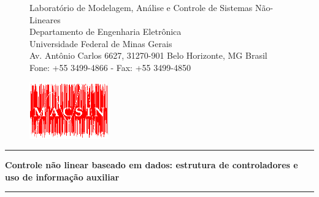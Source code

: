 
\begin{titlepage}

\begin{figure}[!ht]
\begin{minipage}[b]{0.7\linewidth}
\begin{tiny}
Laboratório de Modelagem, Análise e Controle de Sistemas Não-Lineares \\
Departamento de Engenharia Eletrônica\\
Universidade Federal de Minas Gerais\\
Av. Antônio Carlos 6627, 31270-901 Belo Horizonte, MG Brasil\\

Fone: +55 3499-4866 - Fax: +55 3499-4850 %
\end{tiny}
\end{minipage}\hfill
\begin{minipage}[c]{0.3\linewidth}
\begin{flushright}
\vspace{-1.2cm}
\includegraphics[scale=1.37]{mac.png}
\end{flushright}
\end{minipage}
\end{figure}

\vspace{1.75cm}
\begin{center}
\thickhrulefill
\par\nobreak
\vspace*{10pt}%
\hrule
\vspace*{10pt}%
{\bf \Huge \bfseries Controle não linear baseado em dados: estrutura de controladores e uso de informação auxiliar}
\vspace*{10pt}%
\hrule
\vspace*{40pt}%


\end{center}
\end{titlepage}
